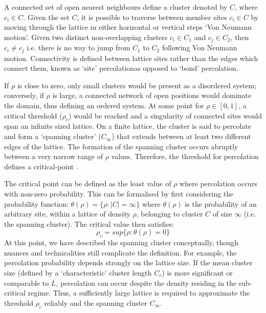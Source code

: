 A connected set of open nearest neighbours define a cluster denoted by $C$, where $c_i \in C$.
Given the set $C$, it is possible to traverse between member sites $c_i \in C$ by moving through the lattice in either horizontal or vertical steps `Von Neumann motion'. 
Given two distinct non-overlapping clusters $c_i \in C_1$ and $c_j \in C_2$, then $c_i \neq c_j $ i.e. there is no way to jump from $C_1$ to $C_2$ following Von Neumann motion. 
Connectivity is defined between lattice sites rather than the edges which connect them, known as `site' percolation\textemdash as opposed to `bond' percolation.

If $\rho$ is close to zero, only small clusters would be present as a disordered system; 
conversely, if $\rho$ is large, a connected network of open positions would dominate the domain, thus defining an ordered system.
At some point for $\rho \in [0, 1]$, a critical threshold ($\rho_c$) would be reached and a singularity of connected sites would span an infinite sized lattice.
On a finite lattice, the cluster is said to percolate and form a `spanning cluster' ($C_\infty$) that extends between at least two different edges of the lattice.
The formation of the spanning cluster occurs abruptly between a very narrow range of $\rho$ values. 
Therefore, the threshold for percolation defines a critical-point \cite{STAUFFER19791}. 

The critical point can be defined as the least value of $\rho$ where percolation occurs with non-zero probability. %
This can be formalised by first considering the probability function: $\theta (\rho)= \lbrace \rho:|C|=\infty\rbrace$ where $\theta(\rho)$ is the probability of an arbitrary site, %
within a lattice of density $\rho$, belonging to cluster $C$ of size $\infty$ (i.e. the spanning cluster). %
The critical value then satisfies: %
\begin{equation}
\label{eq:critical_threshold_1d}
    \rho _{c}=sup \lbrace \rho : \theta (\rho ) = 0 \rbrace
\end{equation}
At this point, we have described the spanning cluster conceptually, though nuances and technicalities still complicate the definition. For example, the percolation probability depends strongly on the lattice size. If the mean cluster size (defined by a `characteristic' cluster length $C_r$) is more significant or comparable to $L$, percolation can occur despite the density residing in the sub-critical regime. Thus, a sufficiently large lattice is required to approximate the threshold $\rho_c$ reliably and the spanning cluster $C_{\infty}$. 

